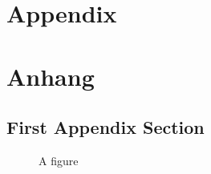 


{\chapter{Appendix}}    %
{\chapter{Anhang}}      %
\label{chap:appendix}


\section{First Appendix Section}
\label{sec:appendix:FirstSection}

\setcounter{figure}{0}

\begin{figure} [ht]
  \centering
  \caption{A figure}
  \label{fig:anotherfigure}
\end{figure}

\newpage
\cite{activityPub}
\cite{activityStreamsCore}
\cite{activityStreamsVocabulary}
\cite{bpb-dezentralisierung}
\cite{bsi-empfehlungen}
\cite{cucumber}
\cite{data-integrity}
\cite{diaspora-about}
\cite{diaspora-introduction}
\cite{distributed-systems}
\cite{fediverse}
\cite{fediverse-report}
\cite{hagengraf}
\cite{http-signature}
\cite{ietf-profile-media}
\cite{jsonld}
\cite{kryptographie}
\cite{netzwerkeffekt}
\cite{oauth-1.0-protocol}
\cite{oauth2}
\cite{pushSocialWeb}
\cite{security-vocab-linked-data}
\cite{social-wg-charter}
\cite{socialWg}
\cite{uni-jena-url-urn-uri-iri}
\cite{web-host-meta}
\cite{wikipedia-dezentralisierung-energie}
\cite{wikipedia-social-network-sociology}
